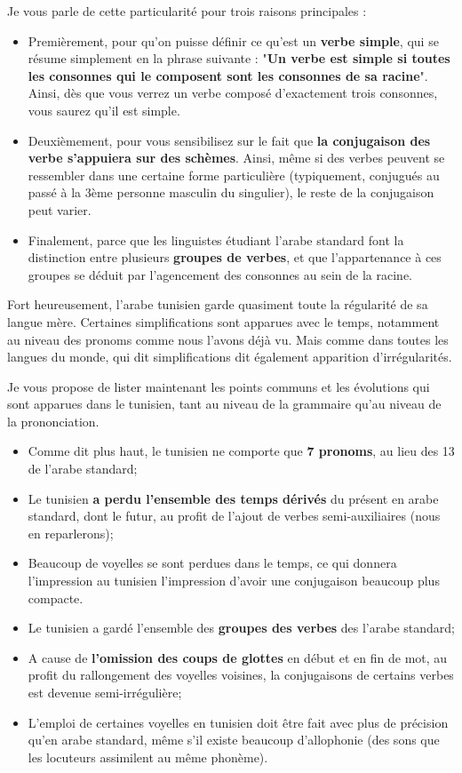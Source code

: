Je vous parle de cette particularité pour trois raisons principales :
\begin{itemize}
    \item Premièrement, pour qu'on puisse définir ce qu'est un \textbf{verbe simple}, qui se résume simplement en la phrase suivante : "\textbf{Un verbe est simple si toutes les consonnes qui le composent sont les consonnes de sa racine}". Ainsi, dès que vous verrez un verbe composé d'exactement trois consonnes, vous saurez qu'il est simple.
    \item Deuxièmement, pour vous sensibilisez sur le fait que \textbf{la conjugaison des verbe s'appuiera sur des schèmes}. Ainsi, même si des verbes peuvent se ressembler dans une certaine forme particulière (typiquement, conjugués au passé à la 3ème personne masculin du singulier), le reste de la conjugaison peut varier.
    \item Finalement, parce que les linguistes étudiant l'arabe standard font la distinction entre plusieurs \textbf{groupes de verbes}, et que l'appartenance à ces groupes se déduit par l'agencement des consonnes au sein de la racine. 
\end{itemize}



Fort heureusement, l'arabe tunisien garde quasiment toute la régularité de sa langue mère. Certaines simplifications sont apparues avec le temps, notamment au niveau des pronoms comme nous l'avons déjà vu. Mais comme dans toutes les langues du monde, qui dit simplifications dit également apparition d'irrégularités.

Je vous propose de lister maintenant les points communs et les évolutions qui sont apparues dans le tunisien, tant au niveau de la grammaire qu'au niveau de la prononciation.

\begin{itemize}
    \item Comme dit plus haut, le tunisien ne comporte que \textbf{7 pronoms}, au lieu des 13 de l'arabe standard;
    \item Le tunisien \textbf{a perdu l'ensemble des temps dérivés} du présent en arabe standard, dont le futur, au profit de l'ajout de verbes semi-auxiliaires (nous en reparlerons);
    \item Beaucoup de voyelles se sont perdues dans le temps, ce qui donnera l'impression au tunisien l'impression d'avoir une conjugaison beaucoup plus compacte.
    \item Le tunisien a gardé l'ensemble des \textbf{groupes des verbes} des l'arabe standard;
    \item A cause de \textbf{l'omission des coups de glottes} en début et en fin de mot, au profit du rallongement des voyelles voisines, la conjugaisons de certains verbes est devenue semi-irrégulière; 
    \item L'emploi de certaines voyelles en tunisien doit être fait avec plus de précision qu'en arabe standard, même s'il existe beaucoup d'allophonie (des sons que les locuteurs assimilent au même phonème).
\end{itemize}

